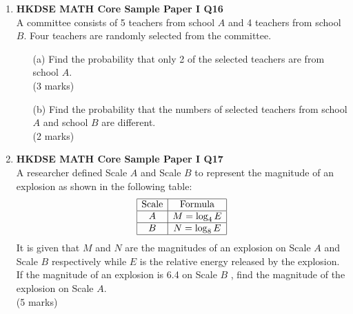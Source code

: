 \documentclass[12pt]{article}
\begin{document}
\begin{enumerate}
	\item \textbf{HKDSE MATH Core Sample Paper I Q16}\\
	A committee consists of 5 teachers from school $A$ and 4 teachers from school $B$. Four teachers are randomly selected from the committee.
	\begin{enumerate}
		\item[(a)] Find the probability that only 2 of the selected teachers are from school $A$. \\(3 marks)
		\item[(b)] Find the probability that the numbers of selected teachers from school $A$ and school $B$ are
		different. \\(2 marks)
	\end{enumerate}

	\item \textbf{HKDSE MATH Core Sample Paper I Q17}\\
	A researcher defined Scale $A$ and Scale $B$ to represent the magnitude of an explosion as shown in the following table:
	$$\begin{array}{|c|c|}
		\hline
		\text{Scale} & \text{Formula} \\
		\hline
		A & M = \log_4{E} \\
		\hline		
		B & N = \log_8{E} \\
		\hline
	\end{array}$$
	It is given that $M$ and $N$ are the magnitudes of an explosion on Scale $A$ and Scale $B$ respectively while $E$ is the relative energy released by the explosion. If the magnitude of an explosion is 6.4 on Scale $B$ , find the magnitude of the explosion on Scale $A$. \\(5 marks)


\end{enumerate}
\end{document}
